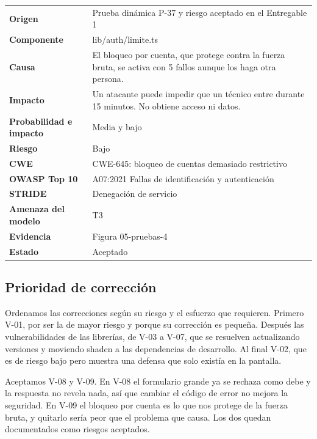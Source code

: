\documentclass[12pt, letterpaper]{article}
\begin{document}
\begingroup\small\setlength{\tabcolsep}{4pt}\renewcommand{\arraystretch}{1.25}
\begin{longtable}{L{0.24}L{0.70}}
\toprule
\endfirsthead
\toprule
\endhead
\bottomrule
\endfoot
\textbf{Origen} & Prueba dinámica P-37 y riesgo aceptado en el Entregable 1 \\
\textbf{Componente} & lib/auth/limite.ts \\
\textbf{Causa} & El bloqueo por cuenta, que protege contra la fuerza bruta, se activa con 5 fallos aunque los haga otra persona. \\
\textbf{Impacto} & Un atacante puede impedir que un técnico entre durante 15 minutos. No obtiene acceso ni datos. \\
\textbf{Probabilidad e impacto} & Media y bajo \\
\textbf{Riesgo} & Bajo \\
\textbf{CWE} & CWE-645: bloqueo de cuentas demasiado restrictivo \\
\textbf{OWASP Top 10} & A07:2021 Fallas de identificación y autenticación \\
\textbf{STRIDE} & Denegación de servicio \\
\textbf{Amenaza del modelo} & T3 \\
\textbf{Evidencia} & Figura 05-pruebas-4 \\
\textbf{Estado} & Aceptado \\
\end{longtable}
\endgroup

\subsection{Prioridad de corrección}

Ordenamos las correcciones según su riesgo y el esfuerzo que requieren. Primero V-01, por ser la de mayor riesgo y porque su corrección es pequeña. Después las vulnerabilidades de las librerías, de V-03 a V-07, que se resuelven actualizando versiones y moviendo shadcn a las dependencias de desarrollo. Al final V-02, que es de riesgo bajo pero muestra una defensa que solo existía en la pantalla.

Aceptamos V-08 y V-09. En V-08 el formulario grande ya se rechaza como debe y la respuesta no revela nada, así que cambiar el código de error no mejora la seguridad. En V-09 el bloqueo por cuenta es lo que nos protege de la fuerza bruta, y quitarlo sería peor que el problema que causa. Los dos quedan documentados como riesgos aceptados.
\end{document}
